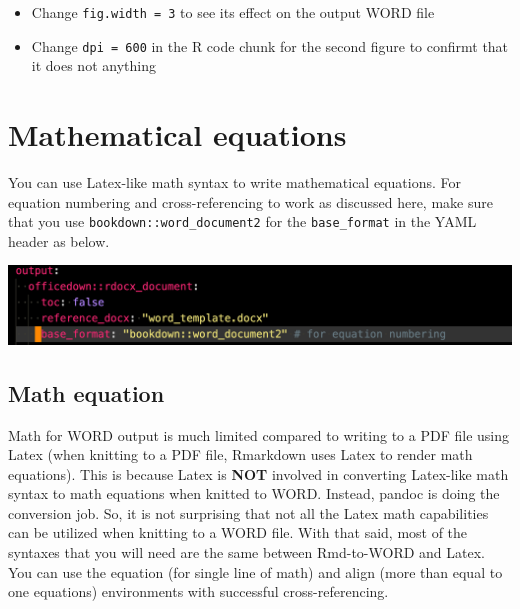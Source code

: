 \documentclass[
  letterpaper,
  DIV=11,
  numbers=noendperiod]{scrreprt}
\providecommand{\tightlist}{%
  \setlength{\itemsep}{0pt}\setlength{\parskip}{0pt}}\usepackage{longtable,booktabs,array}
\begin{document}
\begin{tcolorbox}[enhanced jigsaw, colframe=quarto-callout-note-color-frame, toptitle=1mm, colbacktitle=quarto-callout-note-color!10!white, toprule=.15mm, colback=white, arc=.35mm, bottomtitle=1mm, opacitybacktitle=0.6, breakable, left=2mm, coltitle=black, leftrule=.75mm, title=\textcolor{quarto-callout-note-color}{\faInfo}\hspace{0.5em}{Try!}, rightrule=.15mm, titlerule=0mm, opacityback=0, bottomrule=.15mm]

\begin{itemize}
\tightlist
\item
  Change \texttt{fig.width\ =\ 3} to see its effect on the output WORD
  file
\item
  Change \texttt{dpi\ =\ 600} in the R code chunk for the second figure
  to confirmt that it does not anything
\end{itemize}

\end{tcolorbox}

\hypertarget{mathematical-equations}{%
\section{Mathematical equations}\label{mathematical-equations}}

You can use Latex-like math syntax to write mathematical equations. For
equation numbering and cross-referencing to work as discussed here, make
sure that you use \texttt{bookdown::word\_document2} for the
\texttt{base\_format} in the YAML header as below.

\includegraphics[width=1\textwidth,height=\textheight]{assets/pictures/yaml-math.png}

\hypertarget{math-equation}{%
\subsection{Math equation}\label{math-equation}}

Math for WORD output is much limited compared to writing to a PDF file
using Latex (when knitting to a PDF file, Rmarkdown uses Latex to render
math equations). This is because Latex is \textbf{NOT} involved in
converting Latex-like math syntax to math equations when knitted to
WORD. Instead, pandoc is doing the conversion job. So, it is not
surprising that not all the Latex math capabilities can be utilized when
knitting to a WORD file. With that said, most of the syntaxes that you
will need are the same between Rmd-to-WORD and Latex. You can use the
equation (for single line of math) and align (more than equal to one
equations) environments with successful cross-referencing.
\end{document}
